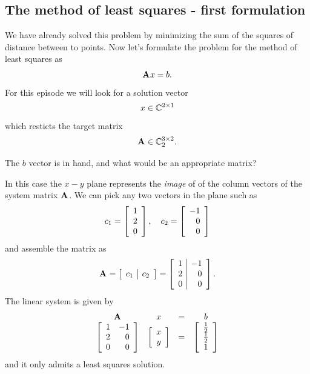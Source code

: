 \subsection{The method of least squares - first formulation}
We have already solved this problem by minimizing the sum of the squares of distance between to points. Now let's formulate the problem for the method of least squares as 
\begin{equation}
 \A{}x=b.
\end{equation}
For this episode we will look for a solution vector
\begin{equation}
  x\in\cmplx{\by{2}{1}}
\end{equation}
which resticts the target matrix
\begin{equation}
  \A{}\in\cmplx{\by{ 3}{2}}_{2}.
\end{equation}

The $b$ vector is in hand, and what would be an appropriate matrix?

In this case the $x-y$ plane represents the \textit{image} of of the column vectors of the system matrix $\A{}$. We can pick any two vectors in the plane such as
\begin{equation}
  c_{1} = \mat{c}{1\\2\\0}, \quad c_{2} = \mat{r}{-1\\0\\0}
\end{equation}
and assemble the matrix as
\begin{equation}
  \A{} = \mat{c|c}{c_{1}&c_{2}}=\mat{r|r}{1&-1\\2&0\\0&0}.
\end{equation}
The linear system is given by
\begin{equation}
  \begin{array}{cccc}
    \A{} & x & = & b \\
    \mat{cr}{1&-1\\2&0\\0&0} & \mat{c}{x\\y} & = & \mat{c}{\frac{1}{2}\\\frac{1}{2}\\1}
  \end{array}
\end{equation}
and it only admits a least squares solution.

